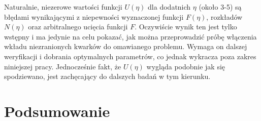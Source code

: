 \documentclass[a4paper,12pt]{article}
\begin{document}
Naturalnie, niezerowe wartości funkcji $U(\eta)$ dla dodatnich $\eta$ (około 3-5) są błędami wynikającymi z niepewności wyznaczonej funkcji $F(\eta)$, rozkładów $N(\eta)$ oraz arbitralnego ucięcia funkcji $F$. Oczywiście wynik ten jest tylko wstępny i ma jedynie na celu pokazać, jak można przeprowadzić próbę włączenia wkładu niezranionych kwarków do omawianego problemu. Wymaga on dalszej weryfikacji i dobrania optymalnych parametrów, co jednak wykracza poza zakres niniejszej pracy. Jednocześnie fakt, że $U(\eta)$ wygląda podobnie jak się spodziewano, jest zachęcający do dalszych badań w tym kierunku.

\newpage
\section{Podsumowanie}
\end{document}
